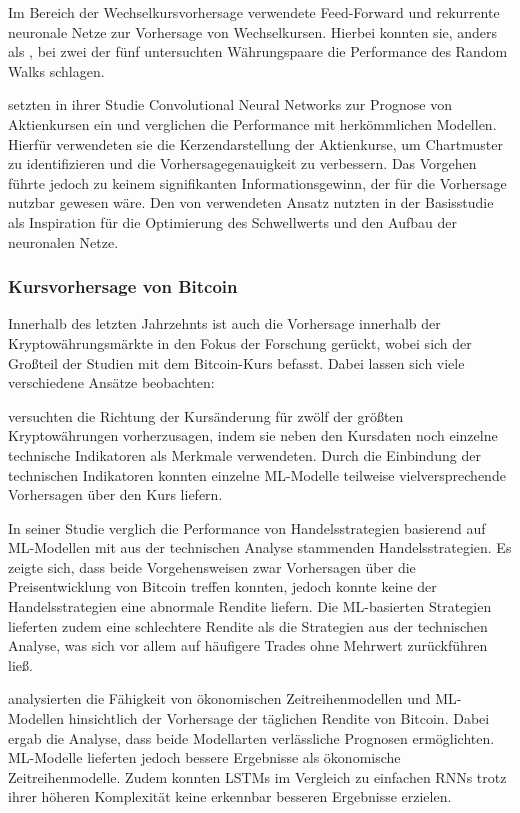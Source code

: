 \documentclass[a4paper, 12pt]{article}
\begin{document}
Im Bereich der Wechselkursvorhersage verwendete \textcite{Kuan1995} Feed-Forward und rekurrente neuronale Netze zur Vorhersage von Wechselkursen.
Hierbei konnten sie, anders als \citeauthor{White1988}, bei zwei der fünf untersuchten Währungspaare die Performance des Random Walks schlagen.

\textcite{Ghoshal2020} setzten in ihrer Studie Convolutional Neural Networks zur Prognose von Aktienkursen ein und verglichen die Performance mit herkömmlichen Modellen.
Hierfür verwendeten sie die Kerzendarstellung der Aktienkurse, um Chartmuster zu identifizieren und die Vorhersagegenauigkeit zu verbessern.
Das Vorgehen führte jedoch zu keinem signifikanten Informationsgewinn, der für die Vorhersage nutzbar gewesen wäre.
Den von \citeauthor{Ghoshal2020} verwendeten Ansatz nutzten \textcite{Goutte2023} in der Basisstudie als Inspiration für die Optimierung des Schwellwerts und den Aufbau der neuronalen Netze.

\subsubsection{Kursvorhersage von Bitcoin}
Innerhalb des letzten Jahrzehnts ist auch die Vorhersage innerhalb der Kryptowährungsmärkte in den Fokus der Forschung gerückt, wobei sich der Großteil der Studien mit dem Bitcoin-Kurs befasst.
Dabei lassen sich viele verschiedene Ansätze beobachten:

\textcite{Akyildirim2021} versuchten die Richtung der Kursänderung für zwölf der größten Kryptowährungen vorherzusagen, indem sie neben den Kursdaten noch einzelne technische Indikatoren als Merkmale verwendeten.
Durch die Einbindung der technischen Indikatoren konnten einzelne ML-Modelle teilweise vielversprechende Vorhersagen über den Kurs liefern.

In seiner Studie verglich \textcite{Anghel2021} die Performance von Handelsstrategien basierend auf ML-Modellen mit aus der technischen Analyse stammenden Handelsstrategien.
Es zeigte sich, dass beide Vorgehensweisen zwar Vorhersagen über die Preisentwicklung von Bitcoin treffen konnten, jedoch konnte keine der Handelsstrategien eine abnormale Rendite liefern.
Die ML-basierten Strategien lieferten zudem eine schlechtere Rendite als die Strategien aus der technischen Analyse, was sich vor allem auf häufigere Trades ohne Mehrwert zurückführen ließ.

\textcite{Berger2024} analysierten die Fähigkeit von ökonomischen Zeitreihenmodellen und ML-Modellen hinsichtlich der Vorhersage der täglichen Rendite von Bitcoin.
Dabei ergab die Analyse, dass beide Modellarten verlässliche Prognosen ermöglichten.
ML-Modelle lieferten jedoch bessere Ergebnisse als ökonomische Zeitreihenmodelle.
Zudem konnten LSTMs im Vergleich zu einfachen RNNs trotz ihrer höheren Komplexität keine erkennbar besseren Ergebnisse erzielen.
\end{document}
